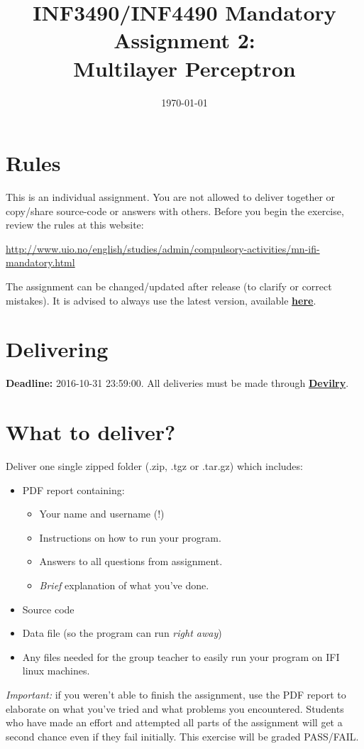\documentclass{article}           %
\title{\vspace{-2cm}INF3490/INF4490 Mandatory Assignment 2:\\
Multilayer Perceptron}
\date{\today}
\newcommand\marginsymbol[1][0pt]{%
\tabto*{0cm}\makebox[\dimexpr-1cm-#1\relax][r]{$\mathbb{P}$}\tabto*{\TabPrevPos}}
\begin{document}
    \renewcommand\marginsymbol[1][0pt]{%
  \tabto*{0cm}\makebox[-1cm][c]{$\mathbb{P}$}\tabto*{\TabPrevPos}}

\maketitle
\section*{Rules}
This is an individual assignment.
You are not allowed to deliver together or copy/share source-code or answers with others.
Before you begin the exercise, review the rules at this website:
\begin{center}
\url{http://www.uio.no/english/studies/admin/compulsory-activities/mn-ifi-mandatory.html}
\end{center}


The assignment can be changed/updated after release (to clarify or correct mistakes).
It is advised to always use the latest version, available
 \href{http://www.uio.no/studier/emner/matnat/ifi/INF3490/h16/assignment-2/inf3490-as2.pdf}{\textbf{here}}.

\section*{Delivering}
\textbf{Deadline:} 2016-10-31 23:59:00. All deliveries must be made through
\href{https://devilry.ifi.uio.no}{\textbf{Devilry}}.
\section*{What to deliver?}
Deliver one single zipped folder (.zip, .tgz or .tar.gz) which includes:
\begin{itemize}
    \item PDF report containing:
    \begin{itemize}
        \item Your name and username (!)
        \item Instructions on how to run your program.
        \item Answers to all questions from assignment.
        \item \emph{Brief} explanation of what you've done.
    \end{itemize}
    \item Source code
    \item Data file (so the program can run \emph{right away})
    \item Any files needed for the group teacher to easily run your program on
          IFI linux machines.
\end{itemize}
\emph{Important: } if you weren't able to finish the assignment, use the PDF
report to elaborate on what you've tried and what problems you encountered.
Students who have made an effort and attempted all parts of the assignment
will get a second chance even if they fail initially. This exercise will be
graded PASS/FAIL.
\end{document}
